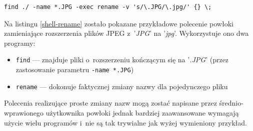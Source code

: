 \begin{lstlisting}[label=shell-rename, caption={Polecenie powłoki zmieniające roszerzenia plików JPEG}]
find ./ -name *.JPG -exec rename -v 's/\.JPG/\.jpg/' {} \;
\end{lstlisting}

\par
Na listingu \ref{shell-rename} zostało pokazane przykładowe polecenie powłoki zamieniające rozszerzenia plików JPEG z~'\textit{JPG}' na '\textit{jpg}'.
Wykorzystuje ono dwa programy:
\begin{itemize}
\item \texttt{find} --- znajduje pliki o~rozszerzeniu kończącym się na '\textit{.JPG}' (przez zastosowanie parametru \texttt{-name *.JPG})
\item \texttt{rename} --- dokonuje faktycznej zmiany nazwy dla pojedynczego pliku
\end{itemize}
Polecenia realizujące proste zmiany nazw mogą zostać napisane przez średnio-wprawionego użytkownika powłoki jednak bardziej zaawansowane wymagają użycie wielu programów i~nie są tak trywialne jak wyżej wymieniony przykład.
